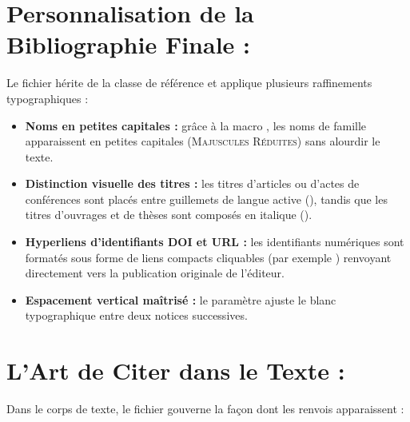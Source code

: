 \section{Personnalisation de la Bibliographie Finale : }
\label{sec:bbx-detail}

Le fichier  hérite de la classe de référence 
et applique plusieurs raffinements typographiques :

\begin{itemize}
  \item \textbf{Noms en petites capitales :}
  grâce à la macro ,
  les noms de famille apparaissent en petites capitales (\textsc{Majuscules Réduites}) sans alourdir le texte.
  \item \textbf{Distinction visuelle des titres :}
  les titres d'articles ou d'actes de conférences sont placés entre guillemets de langue active (),
  tandis que les titres d'ouvrages et de thèses sont composés en italique ().
  \item \textbf{Hyperliens d'identifiants DOI et URL :}
  les identifiants numériques sont formatés sous forme de liens compacts cliquables
  (par exemple ) renvoyant directement vers la publication originale de l'éditeur.
  \item \textbf{Espacement vertical maîtrisé :}
  le paramètre  ajuste le blanc typographique entre deux notices successives.
\end{itemize}

\section{L'Art de Citer dans le Texte : }
\label{sec:cbx-detail}

Dans le corps de texte, le fichier  gouverne la façon dont les renvois apparaissent :

